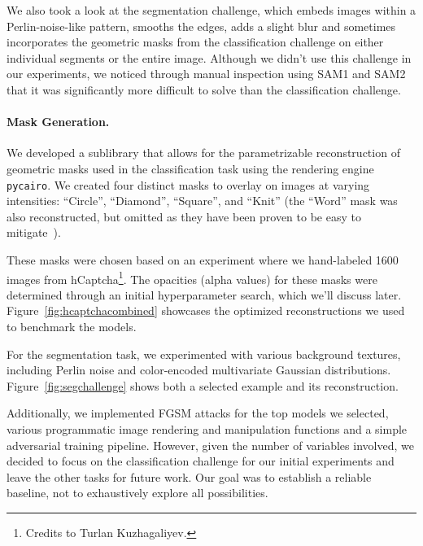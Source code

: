 \documentclass[a4paper, oneside]{discothesis}
\begin{document}
We also took a look at the segmentation challenge, which embeds images within a Perlin-noise-like pattern, smooths the edges, adds a slight blur and sometimes incorporates the geometric masks from the classification challenge on either individual segments or the entire image. Although we didn't use this challenge in our experiments, we noticed through manual inspection using SAM1 and SAM2 that it was significantly more difficult to solve than the classification challenge.

\paragraph{Mask Generation.}

We developed a sublibrary that allows for the parametrizable reconstruction of geometric masks used in the classification task using the rendering engine \texttt{pycairo}. We created four distinct masks to overlay on images at varying intensities: ``Circle'', ``Diamond'', ``Square'', and ``Knit'' (the ``Word'' mask was also reconstructed, but omitted as they have been proven to be easy to mitigate~\cite{zhang2023text,dong2023robust,shayegani2023plug}).

These masks were chosen based on an experiment where we hand-labeled 1600 images from hCaptcha\footnote{Credits to Turlan Kuzhagaliyev.}. The opacities (alpha values) for these masks were determined through an initial hyperparameter search, which we'll discuss later. Figure~\ref{fig:hcaptchacombined} showcases the optimized reconstructions we used to benchmark the models.

For the segmentation task, we experimented with various background textures, including Perlin noise and color-encoded multivariate Gaussian distributions. Figure~\ref{fig:segchallenge} shows both a selected example and its reconstruction.

Additionally, we implemented FGSM attacks for the top models we selected, various programmatic image rendering and manipulation functions and a simple adversarial training pipeline. However, given the number of variables involved, we decided to focus on the classification challenge for our initial experiments and leave the other tasks for future work. Our goal was to establish a reliable baseline, not to exhaustively explore all possibilities.
\end{document}
